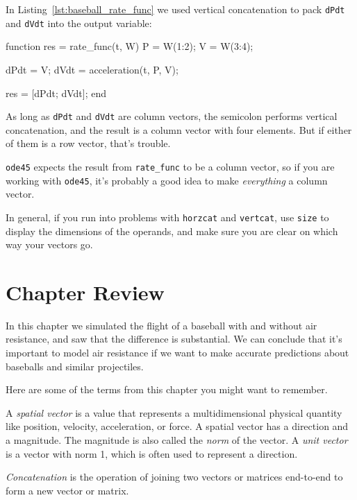 
In Listing~\ref{lst:baseball_rate_func} we used vertical concatenation to pack \lstinline{dPdt} and \lstinline{dVdt} into the output variable:

\begin{code}
function res = rate_func(t, W)
    P = W(1:2);
    V = W(3:4);

    dPdt = V;
    dVdt = acceleration(t, P, V);

    res = [dPdt; dVdt];
end
\end{code}

As long as \lstinline{dPdt} and \lstinline{dVdt} are column vectors,
the semicolon performs vertical concatenation, and the result is
a column vector with four elements.  But if either of them is a
row vector, that's trouble.


\lstinline{ode45} expects the result from \lstinline{rate_func} to be a
column vector, so if you are working with \lstinline{ode45}, it's
probably a good idea to make {\em everything} a column vector.

In general, if you run into problems with \lstinline{horzcat} and
\lstinline{vertcat}, use \lstinline{size} to display the dimensions of the operands,
and make sure you are clear on which way your vectors go.

\section{Chapter Review}

In this chapter we simulated the flight of a baseball with and without air resistance, and saw that the difference is substantial.
We can conclude that it's important to model air resistance if we want to make accurate predictions about baseballs and similar projectiles.

Here are some of the terms from this chapter you might want to remember.

A {\em spatial vector} is a value that represents a multidimensional physical quantity like position, velocity, acceleration, or force.
A spatial vector has a direction and a magnitude.  The magnitude is also called the {\em norm} of the vector.
A {\em unit vector} is a vector with norm 1, which is often used to represent a
direction.

{\em Concatenation} is the operation of joining two vectors or matrices end-to-end to
form a new vector or matrix.

